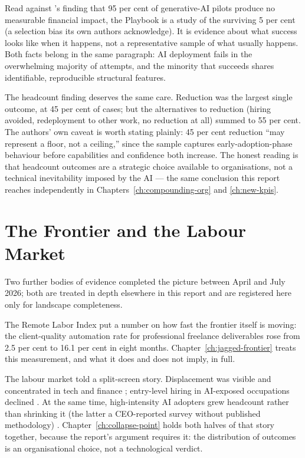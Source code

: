 Read against \textcite{MITNANDA2025}'s finding that 95 per cent of generative-AI pilots produce no measurable financial impact, the Playbook is a study of the surviving 5 per cent (a selection bias its own authors acknowledge). It is evidence about what success looks like when it happens, not a representative sample of what usually happens. Both facts belong in the same paragraph: AI deployment fails in the overwhelming majority of attempts, and the minority that succeeds shares identifiable, reproducible structural features.

The headcount finding deserves the same care. Reduction was the largest single outcome, at 45 per cent of cases; but the alternatives to reduction (hiring avoided, redeployment to other work, no reduction at all) summed to 55 per cent. The authors' own caveat is worth stating plainly: 45 per cent reduction ``may represent a floor, not a ceiling,'' since the sample captures early-adoption-phase behaviour before capabilities and confidence both increase. The honest reading is that headcount outcomes are a strategic choice available to organisations, not a technical inevitability imposed by the AI --- the same conclusion this report reaches independently in Chapters~\ref{ch:compounding-org} and \ref{ch:new-kpis}.

\section{The Frontier and the Labour Market}

Two further bodies of evidence completed the picture between April and July 2026; both are treated in depth elsewhere in this report and are registered here only for landscape completeness.

The Remote Labor Index \parencite{CAIS2026RLI, RLI2025} put a number on how fast the frontier itself is moving: the client-quality automation rate for professional freelance deliverables rose from 2.5 per cent to 16.1 per cent in eight months. Chapter~\ref{ch:jagged-frontier} treats this measurement, and what it does and does not imply, in full.

The labour market told a split-screen story. Displacement was visible and concentrated in tech and finance \parencite{Challenger2026}; entry-level hiring in AI-exposed occupations declined \parencite{Brynjolfsson2025Canaries}. At the same time, high-intensity AI adopters grew headcount rather than shrinking it (the latter a CEO-reported survey without published methodology) \parencite{RampRevelio2026, Levie2026}. Chapter~\ref{ch:collapse-point} holds both halves of that story together, because the report's argument requires it: the distribution of outcomes is an organisational choice, not a technological verdict.

